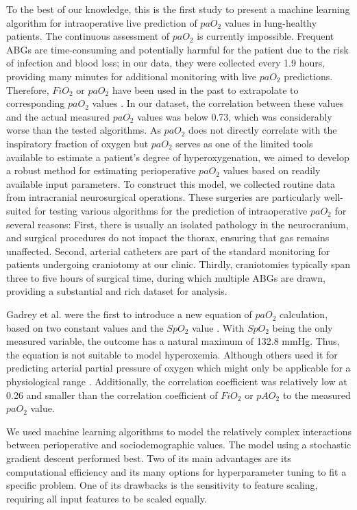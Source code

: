 \documentclass[referee,lineno,pdflatex,sn-nature]{sn-jnl}%
\theoremstyle{thmstyleone}%
\theoremstyle{thmstyletwo}%
\theoremstyle{thmstylethree}%
\begin{document}
To the best of our knowledge, this is the first study to present a machine learning algorithm for intraoperative live prediction of $paO_2$ values in lung-healthy patients. The continuous assessment of $paO_2$ is currently impossible. Frequent ABGs are time-consuming and potentially harmful for the patient due to the risk of infection and blood loss; in our data, they were collected every 1.9 hours, providing many minutes for additional monitoring with live $paO_2$ predictions. Therefore, $FiO_2$ or $paO_2$ have been used in the past to extrapolate to corresponding $paO_2$ values \cite{Brown2017,Bou-Khalil2017,Sanz2015,Fried1994,Gross1981,Al-Otaibi2011}. In our dataset, the correlation between these values and the actual measured $paO_2$ values was below 0.73, which was considerably worse than the tested algorithms. As $paO_2$ does not directly correlate with the inspiratory fraction of oxygen but $paO_2$ serves as one of the limited tools available to estimate a patient’s degree of hyperoxygenation, we aimed to develop a robust method for estimating perioperative $paO_2$ values based on readily available input parameters. To construct this model, we collected routine data from intracranial neurosurgical operations. These surgeries are particularly well-suited for testing various algorithms for the prediction of intraoperative $paO_2$ for several reasons: First, there is usually an isolated pathology in the neurocranium, and surgical procedures do not impact the thorax, ensuring that gas remains unaffected. Second, arterial catheters are part of the standard monitoring for patients undergoing craniotomy at our clinic. Thirdly, craniotomies typically span three to five hours of surgical time, during which multiple ABGs are drawn, providing a substantial and rich dataset for analysis.

Gadrey et al. were the first to introduce a new equation of $paO_2$ calculation, based on two constant values and the $SpO_2$ value \cite{Gadrey2019}. With $SpO_2$ being the only measured variable, the outcome has a natural maximum of 132.8 mmHg. Thus, the equation is not suitable to model hyperoxemia. Although others used it for predicting arterial partial pressure of oxygen which might only be applicable for a physiological range \cite{Brockway1998,Roettgering2021}. Additionally, the correlation coefficient was relatively low at 0.26 and smaller than the correlation coefficient of $FiO_2$ or $pAO_2$ to the measured $paO_2$ value.


We used machine learning algorithms to model the relatively complex interactions between perioperative and sociodemographic values. The model using a stochastic gradient descent performed best. Two of its main advantages are its computational efficiency and its many options for hyperparameter tuning to fit a specific problem. One of its drawbacks is the sensitivity to feature scaling, requiring all input features to be scaled equally.
\end{document}
